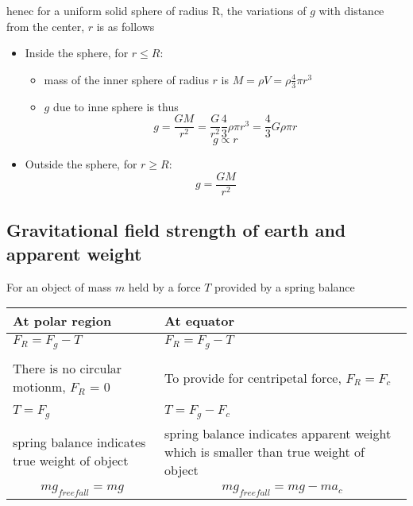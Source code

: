 \documentclass[a4paper, 10pt]{article}
\begin{document}
henec for a uniform solid sphere of radius R, the variations of $g$ with distance from the center, $r$ is as follows

\begin{itemize}
   \item Inside the sphere, for $r \le R$: 
      \begin{itemize}
         \item mass of the inner sphere of radius $r$ is $M = \rho V = \rho \frac{4}{3}\pi r^3$
         \item $g$ due to inne sphere is thus
            \[
           g = \frac{GM}{r^2} = \frac{G}{r^2} \frac{4}{3}\rho \pi r^3 = \frac{4}{3} G \rho\pi r
            \]
            \[
            g \propto r
            \]
            
            
      \end{itemize}	
   \item Outside the sphere, for $r \ge R$: 
      \[
      g = \frac{GM}{r^2}
      \]
\end{itemize}	
\subsection{Gravitational field strength of earth and apparent weight}
For an object of mass $m$ held by a force $T$ provided by a spring balance \\

\begin{center}
   \begin{tabular}{L|L}
      At polar region & At equator \\
      \hline
      $F_R = F_g - T$  &
      $F_R = F_g - T$  \\ 
                       & \\
      There is no circular motionm, $F_R$ = 0 & To provide for centripetal force, $F_R = F_c$ \\
      & \\
      $T = F_g$ & $ T = F_g - F_c$ \\
      spring balance indicates true weight of object & spring balance indicates apparent weight which is smaller than true weight of object \\
      \[
         mg_{freefall} = mg
      \] 
      & 
      \[
         mg_{freefall} = mg - ma_c
      \]
      
   \end{tabular}
\end{center}
\end{document}
